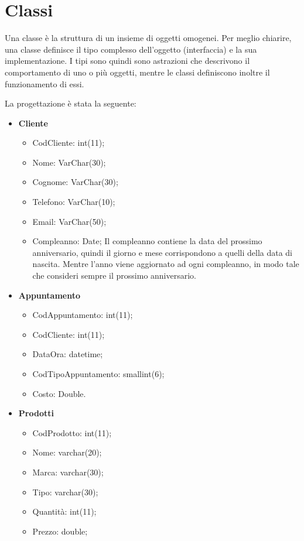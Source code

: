 \section{Classi}{
	Una classe è la struttura di un insieme di oggetti omogenei. Per meglio chiarire, una classe definisce il tipo complesso dell'oggetto (interfaccia) e la sua implementazione. I tipi sono quindi sono astrazioni che descrivono il comportamento di uno o più oggetti, mentre le classi definiscono inoltre il funzionamento di essi.
	
	La progettazione è stata la seguente: 	
	\begin{itemize}\itemsep1pt
		\item \textbf{Cliente} 
		\begin{itemize}\itemsep1pt
			\item CodCliente: int(11);
			\item Nome: VarChar(30);
			\item Cognome: VarChar(30);
			\item Telefono: VarChar(10);
			\item Email: VarChar(50);
			\item Compleanno: Date; Il compleanno contiene la data del prossimo anniversario, quindi il giorno e mese corrispondono a quelli della data di nascita. Mentre l’anno viene aggiornato ad ogni compleanno, in modo tale che consideri sempre il prossimo anniversario.
		\end{itemize}
		\item \textbf{Appuntamento}
		\begin{itemize}\itemsep1pt
			\item CodAppuntamento: int(11);
			\item CodCliente: int(11);
			\item DataOra: datetime;
			\item CodTipoAppuntamento:	smallint(6);
			\item Costo: Double.
		\end{itemize}
		\item \textbf{Prodotti}
		\begin{itemize}\itemsep1pt
			\item CodProdotto: int(11);
			\item Nome:	varchar(20);
			\item Marca: varchar(30);
			\item Tipo: varchar(30);
			\item Quantità: int(11);
			\item Prezzo: double;

\end{itemize}
\end{itemize}}

